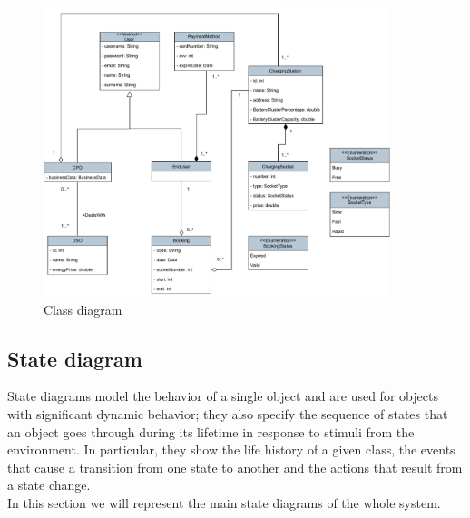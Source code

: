 \begin{figure}[H]
\begin{center}
\includegraphics[width=0.9\textwidth]{images/classdiagram.pdf}
\caption{Class diagram}
\label{fig:class_diagram}
\end{center}
\end{figure}
\subsection{State diagram}
State diagrams model the behavior of a single object and are used for objects with significant dynamic behavior; they also specify the sequence of states that an object goes through during its lifetime in response to stimuli from the environment. In particular, they show the life history of a given class, the events that cause a transition from one state to another and the actions that result from a state change.\\
In this section we will represent the main state diagrams of the whole system.
